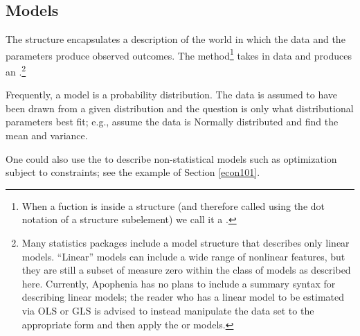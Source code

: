 
\subsection{Models}
The  structure encapsulates a description of the world
in which the data and the parameters produce observed outcomes. The
 method\footnote{When a fuction
is inside a structure (and therefore called using the dot notation of a
structure subelement) we call it a .} takes in data and
produces an .\footnote{Many statistics
packages include a model structure that describes only linear models.
``Linear'' models can include a wide range of nonlinear features, but
they are still a subset of measure zero within the class of models as
described here. Currently, Apophenia has no plans to include a summary
syntax for describing linear models; the reader who has a linear model
to be estimated via OLS or GLS is advised to instead manipulate the
data set to the appropriate form and then apply the 
or  models.}



Frequently, a model is a probability distribution. The data is assumed
to have been drawn from a given distribution and the question is
only what distributional parameters best fit; e.g., assume the data
is Normally distributed and find the mean and variance.

One could also use the  to describe 
non-statistical models such as optimization subject to constraints;
see the example of Section \ref{econ101}.

